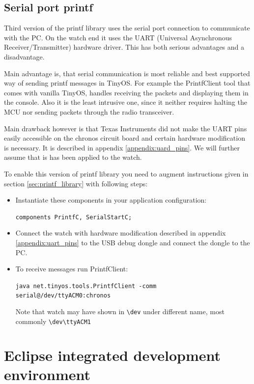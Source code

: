 \subsection{Serial port printf}
Third version of the printf library uses the serial port connection to
communicate with the PC. On the watch end it uses the UART (Universal
Asynchronous Receiver/Transmitter) hardware driver. This has both
serious advantages and a disadvantage.

Main advantage is, that serial communication is most reliable and best
supported way of sending printf messages in TinyOS. For example the
PrintfClient tool that comes with vanilla TinyOS, handles receiving
the packets and displaying them in the console. Also it is the least
intrusive one, since it neither requires halting the MCU nor sending
packets through the radio transceiver.

Main drawback however is that Texas Instruments did not make the UART
pins easily accessible on the chronos circuit board and certain
hardware modification is necessary.  It is described in appendix
\ref{appendix:uard_pins}. We will further assume that is has been
applied to the watch.

To enable this version of printf library you need to augment
instructions given in section \ref{sec:printf_library} with following
steps:

\begin{itemize}
  \item Instantiate these components in your application configuration:

  \texttt{components PrintfC, SerialStartC;}

  \item Connect the watch with hardware modification described in
    appendix \ref{appendix:uart_pins} to the USB debug dongle and
    connect the dongle to the PC.

  \item To receive messages run PrintfClient:

  \texttt{java net.tinyos.tools.PrintfClient -comm serial@/dev/ttyACM0:chronos}

  Note that watch may have shown in \texttt{\textbackslash dev} under
  different name, most commonly
  \texttt{\textbackslash dev\textbackslash ttyACM1}
\end{itemize}

\section{Eclipse integrated development environment}

